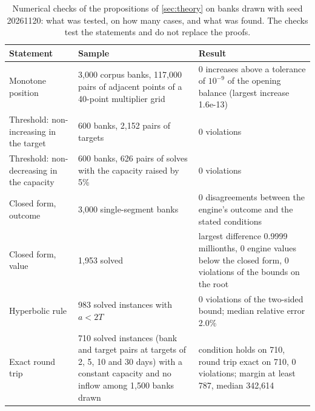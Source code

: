 \begin{table}[htbp]
\centering
\small
\setlength{\tabcolsep}{3pt}
\caption{Numerical checks of the propositions of \cref{sec:theory} on banks drawn with seed 20261120: what was tested, on how many cases, and what was found. The checks test the statements and do not replace the proofs.}
\label{tab:theory-checks}
\begin{tabular}{p{3.2cm}p{4.6cm}p{6.6cm}}
\toprule
Statement & Sample & Result \\
\midrule
Monotone position & 3,000 corpus banks, 117,000 pairs of adjacent points of a 40-point multiplier grid & 0 increases above a tolerance of $10^{-9}$ of the opening balance (largest increase 1.6e-13) \\
Threshold: non-increasing in the target & 600 banks, 2,152 pairs of targets & 0 violations \\
Threshold: non-decreasing in the capacity & 600 banks, 626 pairs of solves with the capacity raised by 5\% & 0 violations \\
Closed form, outcome & 3,000 single-segment banks & 0 disagreements between the engine's outcome and the stated conditions \\
Closed form, value & 1,953 solved & largest difference 0.9999 millionths, 0 engine values below the closed form, 0 violations of the bounds on the root \\
Hyperbolic rule & 983 solved instances with $a<2T$ & 0 violations of the two-sided bound; median relative error 2.0\% \\
Exact round trip & 710 solved instances (bank and target pairs at targets of 2, 5, 10 and 30 days) with a constant capacity and no inflow among 1,500 banks drawn & condition holds on 710, round trip exact on 710, 0 violations; margin at least 787, median 342,614 \\
\bottomrule
\end{tabular}
\end{table}
